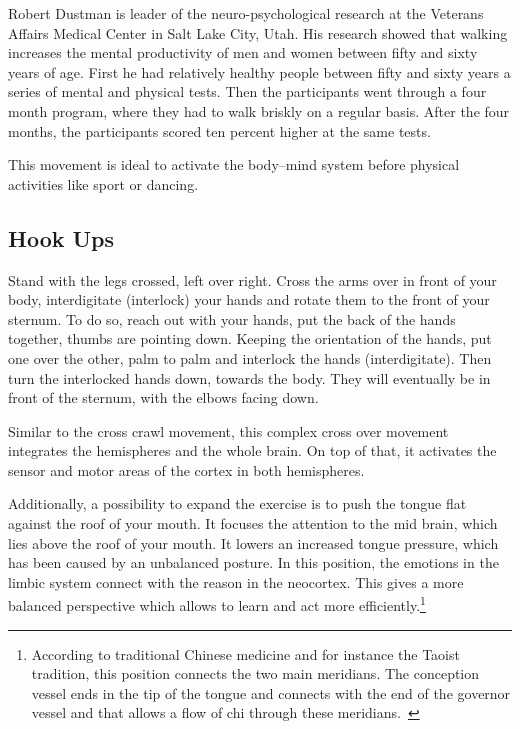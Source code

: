 \documentclass[../main.tex]{subfiles}
\begin{document}
  Robert Dustman is leader of the neuro-psychological research at the Veterans Affairs Medical Center in Salt Lake City, Utah.
  His research showed that walking increases the mental productivity of men and women between fifty and sixty years of age.
  First he had relatively healthy people between fifty and sixty years a series of mental and physical tests.
  Then the participants went through a four month program, where they had to walk briskly on a regular basis.
  After the four months, the participants scored ten percent higher at  the same tests.

  This movement is ideal to {activate the body--mind system} before physical activities like sport or dancing.

  \subsection{Hook Ups}
  
  Stand with the {legs crossed}, left over right.
  {Cross the arms} over in front of your body, interdigitate (interlock) your hands and rotate them {to the front of your sternum}.
  To do so, reach out with your hands, put the {back of the hands together}, thumbs are pointing down.
  Keeping the orientation of the hands, put one over the other, palm to palm and {interlock the hands} (interdigitate).
  Then {turn} the interlocked {hands down, towards the body}. They will eventually be {in front of the sternum}, with the elbows facing down. 

  Similar to the cross crawl movement, this complex cross over movement {integrates the hemispheres} and the whole brain.
  On top of that, it activates the {sensor and motor areas}
  of the cortex in both hemispheres.
  
  Additionally, a possibility to expand the exercise is to push the tongue flat against the roof of your mouth.
  It focuses the attention to the {mid brain}, which lies above the roof of your mouth.
  It lowers an {increased tongue pressure}, which has been   caused by an unbalanced posture.
  In this position,  the emotions in the limbic system connect with the reason in the neocortex.
  This gives a more balanced perspective which allows to learn and act
  more 
  efficiently.\footnote{According
    to traditional Chinese medicine and for instance the Taoist tradition, this position connects the {two main meridians}.
  The conception vessel ends in the tip of the tongue and connects with the end of the governor vessel and that allows a flow of chi through these meridians.~\cite{ChiaMCO}}
 
\end{document}

